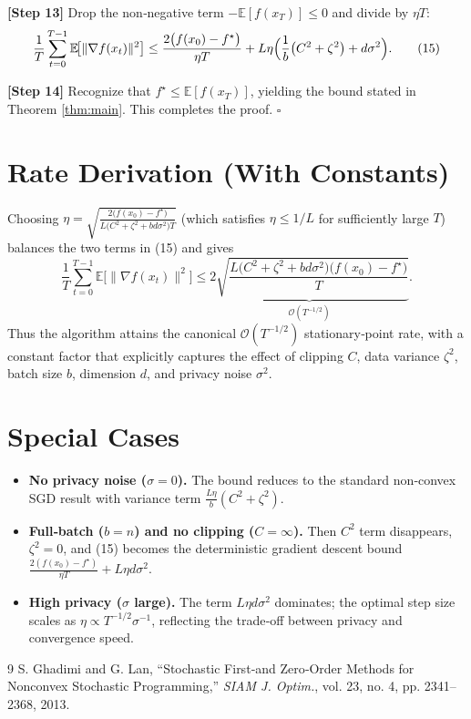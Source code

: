 \documentclass[11pt]{article}
\newcommand{\E}{\mathbb{E}}
\newcommand{\grad}{\nabla}
\begin{document}
\noindent\textbf{[Step 13]} Drop the non‑negative term $-\E[f(x_{T})]\le 0$ and divide by $\eta T$:
\[
\frac{1}{T}\sum_{t=0}^{T-1}\E\!\bigl[\|\grad f(x_{t})\|^{2}\bigr]
\le \frac{2\bigl(f(x_{0})-f^{\star}\bigr)}{\eta T}
+ L\eta\Bigl(\frac{1}{b}\bigl(C^{2}+\zeta^{2}\bigr)+d\sigma^{2}\Bigr).
\tag{15}
\]

\noindent\textbf{[Step 14]} Recognize that $f^{\star}\le \E[f(x_{T})]$, yielding the bound stated in Theorem \ref{thm:main}. This completes the proof. \hfill $\square$

\section*{Rate Derivation (With Constants)}
Choosing $\eta = \sqrt{\frac{2\bigl(f(x_{0})-f^{\star}\bigr)}{L\bigl(C^{2}+\zeta^{2}+bd\sigma^{2}\bigr)T}}$ (which satisfies $\eta\le 1/L$ for sufficiently large $T$) balances the two terms in (15) and gives
\[
\frac{1}{T}\sum_{t=0}^{T-1}\E\!\bigl[\|\grad f(x_{t})\|^{2}\bigr]
\le
\underbrace{2\sqrt{\frac{L\bigl(C^{2}+\zeta^{2}+bd\sigma^{2}\bigr)
\bigl(f(x_{0})-f^{\star}\bigr)}{T}}}_{\displaystyle \mathcal{O}(T^{-1/2})}.
\]
Thus the algorithm attains the canonical $\mathcal{O}(T^{-1/2})$ stationary‑point rate, with a constant factor that explicitly captures the effect of clipping $C$, data variance $\zeta^{2}$, batch size $b$, dimension $d$, and privacy noise $\sigma^{2}$.

\section*{Special Cases}
\begin{itemize}
\item \textbf{No privacy noise ($\sigma=0$).} The bound reduces to the standard non‑convex SGD result with variance term $\frac{L\eta}{b}(C^{2}+\zeta^{2})$.
\item \textbf{Full‑batch ($b=n$) and no clipping ($C=\infty$).} Then $C^{2}$ term disappears, $\zeta^{2}=0$, and (15) becomes the deterministic gradient descent bound $\frac{2(f(x_{0})-f^{\star})}{\eta T}+L\eta d\sigma^{2}$.
\item \textbf{High privacy ($\sigma$ large).} The term $L\eta d\sigma^{2}$ dominates; the optimal step size scales as $\eta\propto T^{-1/2}\sigma^{-1}$, reflecting the trade‑off between privacy and convergence speed.
\end{itemize}

\begin{thebibliography}{9}
S. Ghadimi and G. Lan, ``Stochastic First‑and Zero‑Order Methods for Nonconvex Stochastic Programming,'' \emph{SIAM J. Optim.}, vol. 23, no. 4, pp. 2341–2368, 2013.
\end{thebibliography}
\end{document}
